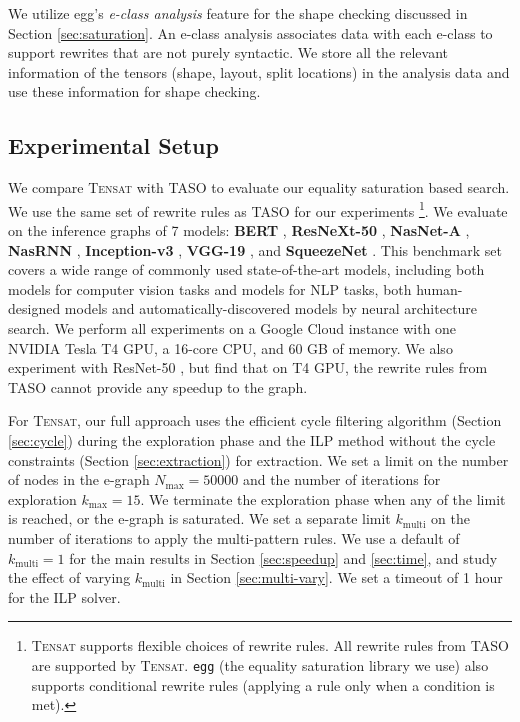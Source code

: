 \documentclass{article}
\newcommand{\ourname}[0]{\textsc{Tensat}}
\begin{document}
We utilize egg's \textit{e-class analysis} feature for the shape checking discussed in Section \ref{sec:saturation}. 
An e-class analysis associates data with each e-class to support rewrites that are not purely syntactic. 
We store all the relevant information of the tensors (shape, layout, split locations) in the analysis data and use these information for shape checking. 

\subsection{Experimental Setup}

We compare \ourname{} with TASO \cite{taso} to evaluate our equality saturation based search.
We use the same set of rewrite rules as TASO for our experiments \footnote{ \ourname{} supports flexible choices of rewrite rules. All rewrite rules from TASO are supported by \ourname{}. \texttt{egg} (the equality saturation library we use) also supports conditional rewrite rules (applying a rule only when a condition is met).}. 
We evaluate on the inference graphs of 7 models:
\textbf{BERT} \cite{bert}, \textbf{ResNeXt-50} \cite{resnext50}, \textbf{NasNet-A} \cite{nasneta}, \textbf{NasRNN} \cite{nasrnn}, \textbf{Inception-v3} \cite{inceptionv3},
\textbf{VGG-19} \cite{vgg}, and \textbf{SqueezeNet} \cite{squeezenet}. 
This benchmark set covers a wide range of commonly used state-of-the-art models, including both models for computer vision tasks and models for NLP tasks, both human-designed models and automatically-discovered models by neural architecture search.
We perform all experiments on a Google Cloud instance with one NVIDIA Tesla T4 GPU, a 16-core CPU, and 60 GB of memory.
We also experiment with ResNet-50 \cite{resnet}, but find that on T4 GPU, the rewrite rules from TASO cannot provide any speedup to the graph.

For \ourname{}, our full approach uses the efficient cycle filtering algorithm (Section \ref{sec:cycle}) during the exploration phase and the ILP method without the cycle constraints (Section \ref{sec:extraction}) for extraction. 
We set a limit on the number of nodes in the e-graph $N_{\textrm{max}}=50000$ and the number of iterations for exploration $k_{\textrm{max}}=15$.
We terminate the exploration phase when any of the limit is reached, or the e-graph is saturated. 
We set a separate limit $k_{\textrm{multi}}$ on the number of iterations to apply the multi-pattern rules.
We use a default of $k_{\textrm{multi}}=1$ for the main results in Section \ref{sec:speedup} and \ref{sec:time}, and study the effect of varying $k_{\textrm{multi}}$ in Section \ref{sec:multi-vary}.
We set a timeout of 1 hour for the ILP solver.
\end{document}
